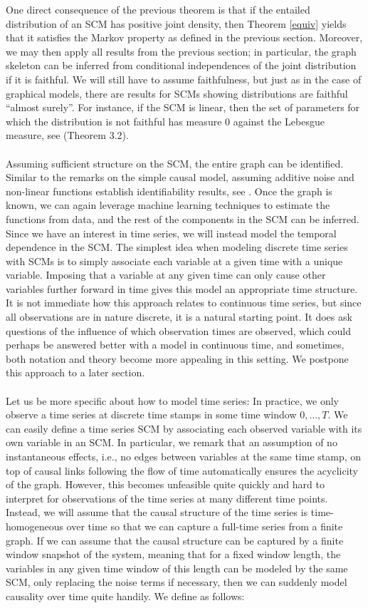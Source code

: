 \documentclass[11pt, a4paper]{memoir}
\theoremstyle{break}
\theoremstyle{break}
\theoremstyle{nonumberplain}
\begin{document}
One direct consequence of the previous theorem is that if the entailed distribution of an SCM has positive joint density, then Theorem \ref{equiv} yields that it satisfies the Markov property as defined in the previous section. Moreover, we may then apply all results from the previous section; in particular, the graph skeleton can be inferred from conditional independences of the joint distribution if it is faithful. We will still have to assume faithfulness, but just as in the case of graphical models, there are results for SCMs showing distributions are faithful \enquote{almost surely}. For instance, if the SCM is linear, then the set of parameters for which the distribution is not faithful has measure 0 against the Lebesgue measure, see \cite{Spirtes} (Theorem 3.2).\\\\
Assuming sufficient structure on the SCM, the entire graph can be identified. Similar to the remarks on the simple causal model, assuming additive noise and non-linear functions establish identifiability results, see \cite{ANM3}. Once the graph is known, we can again leverage machine learning techniques to estimate the functions from data, and the rest of the components in the SCM can be inferred. Since we have an interest in time series, we will instead model the temporal dependence in the SCM. The simplest idea when modeling discrete time series with SCMs is to simply associate each variable at a given time with a unique variable. Imposing that a variable at any given time can only cause other variables further forward in time gives this model an appropriate time structure. It is not immediate how this approach relates to continuous time series, but since all observations are in nature discrete, it is a natural starting point. It does ask questions of the influence of which observation times are observed, which could perhaps be answered better with a model in continuous time, and sometimes, both notation and theory become more appealing in this setting. We postpone this approach to a later section.\\\\
Let us be more specific about how to model time series: In practice, we only observe a time series at discrete time stamps in some time window $0,\ldots, T$. We can easily define a time series SCM by associating each observed variable with its own variable in an SCM. In particular, we remark that an assumption of no instantaneous effects, i.e., no edges between variables at the same time stamp, on top of causal links following the flow of time automatically ensures the acyclicity of the graph. However, this becomes unfeasible quite quickly and hard to interpret for observations of the time series at many different time points. Instead, we will assume that the causal structure of the time series is time-homogeneous over time so that we can capture a full-time series from a finite graph. If we can assume that the causal structure can be captured by a finite window snapshot of the system, meaning that for a fixed window length, the variables in any given time window of this length can be modeled by the same SCM, only replacing the noise terms if necessary, then we can suddenly model causality over time quite handily. We define as follows:
\end{document}
